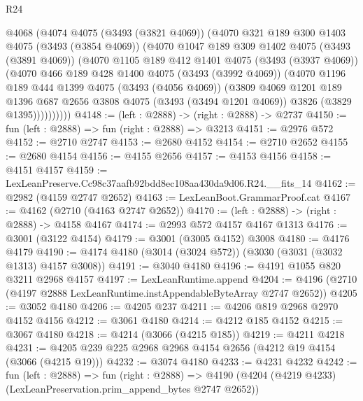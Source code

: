 \begin{lexlean}{R24}
\begin{coremodule}
      @4068
        (@4074
          @4075
          (@3493 (@3821 @4069))
          (@4070
            @321
            @189
            @300
            @1403
            @4075
            (@3493 (@3854 @4069))
            (@4070
              @1047
              @189
              @309
              @1402
              @4075
              (@3493 (@3891 @4069))
              (@4070
                @1105
                @189
                @412
                @1401
                @4075
                (@3493 (@3937 @4069))
                (@4070
                  @466
                  @189
                  @428
                  @1400
                  @4075
                  (@3493 (@3992 @4069))
                  (@4070
                    @1196
                    @189
                    @444
                    @1399
                    @4075
                    (@3493 (@4056 @4069))
                    (@3809
                      @4069
                      @1201
                      @189
                      @1396
                      @687
                      @2656
                      @3808
                      @4075
                      (@3493 (@3494 @1201 @4069))
                      @3826
                      (@3829 @1395))))))))))
@4148 := (left : @2888) -> (right : @2888) -> @2737
@4150 := fun (left : @2888) => fun (right : @2888) => @3213
@4151 := @2976 @572
@4152 := @2710 @2747
@4153 := @2680 @4152
@4154 := @2710 @2652
@4155 := @2680 @4154
@4156 := @4155 @2656
@4157 := @4153 @4156
@4158 := @4151 @4157
@4159 := LexLeanPreserve.Cc98c37aafb92bdd8ec108aa430da9d06.R24.__fits_14
@4162 := @2982 (@4159 @2747 @2652)
@4163 := LexLeanBoot.GrammarProof.cat
@4167 := @4162 (@2710 (@4163 @2747 @2652))
@4170 := (left : @2888) -> (right : @2888) -> @4158 @4167
@4174 := @2993 @572 @4157 @4167 @1313
@4176 := @3001 (@3122 @4154)
@4179 := @3001 (@3005 @4152) @3008
@4180 := @4176 @4179
@4190 := @4174 @4180 (@3014 (@3024 @572)) (@3030 (@3031 (@3032 @1313) @4157 @3008))
@4191 := @3040 @4180
@4196 := @4191 @1055 @820 @3211 @2968 @4157
@4197 := LexLeanRuntime.append
@4204 := @4196 (@2710 (@4197 @2888 LexLeanRuntime.instAppendableByteArray @2747 @2652))
@4205 := @3052 @4180
@4206 := @4205 @237
@4211 := @4206 @819 @2968 @2970 @4152 @4156
@4212 := @3061 @4180
@4214 := @4212 @185 @4152
@4215 := @3067 @4180
@4218 := @4214 (@3066 (@4215 @185))
@4219 := @4211 @4218
@4231 := @4205 @239 @225 @2968 @2968 @4154 @2656 (@4212 @19 @4154 (@3066 (@4215 @19)))
@4232 := @3074 @4180
@4233 := @4231 @4232
@4242 := fun (left : @2888) =>
  fun (right : @2888) =>
  @4190 (@4204 (@4219 @4233) (LexLeanPreservation.prim_append_bytes @2747 @2652))

\end{coremodule}
\end{lexlean}

